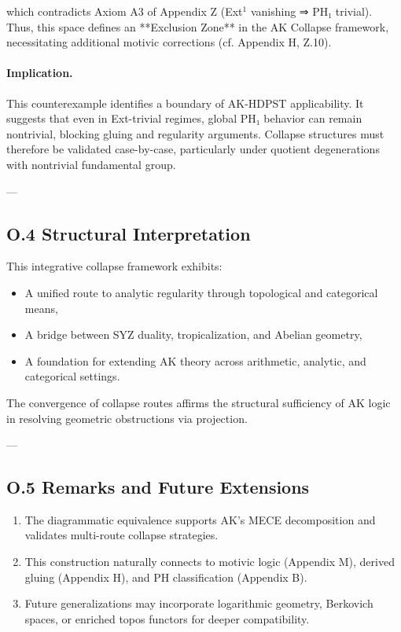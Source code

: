 \documentclass[11pt]{article}
\begin{document}
\begin{axiom}
\begin{axiom}
{{which contradicts Axiom A3 of Appendix Z (Ext$^1$ vanishing ⇒ PH₁ trivial).  
Thus, this space defines an **Exclusion Zone** in the AK Collapse framework, necessitating additional motivic corrections (cf. Appendix H, Z.10).

\paragraph{Implication.}
This counterexample identifies a boundary of AK-HDPST applicability. It suggests that even in Ext-trivial regimes, global PH₁ behavior can remain nontrivial, blocking gluing and regularity arguments. Collapse structures must therefore be validated case-by-case, particularly under quotient degenerations with nontrivial fundamental group.


---

\subsection*{O.4 Structural Interpretation}

This integrative collapse framework exhibits:

\begin{itemize}
  \item A unified route to analytic regularity through topological and categorical means,
  \item A bridge between SYZ duality, tropicalization, and Abelian geometry,
  \item A foundation for extending AK theory across arithmetic, analytic, and categorical settings.
\end{itemize}

The convergence of collapse routes affirms the structural sufficiency of AK logic in resolving geometric obstructions via projection.

---

\subsection*{O.5 Remarks and Future Extensions}

\begin{enumerate}
  \item The diagrammatic equivalence supports AK’s MECE decomposition and validates multi-route collapse strategies.
  \item This construction naturally connects to motivic logic (Appendix M), derived gluing (Appendix H), and PH classification (Appendix B).
  \item Future generalizations may incorporate logarithmic geometry, Berkovich spaces, or enriched topos functors for deeper compatibility.
\end{enumerate}


}}
\end{axiom}
\end{axiom}
\end{document}

